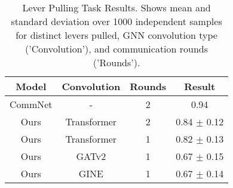 
\begin{table}[h]
\centering
\begin{tabular}{|c|c|c|c|}
\hline
\textbf{Model} & \textbf{Convolution} & \textbf{Rounds} & \textbf{Result} \\
\hline
CommNet & - & 2 & 0.94 \\
Ours & Transformer & 2 & 0.84 $\pm$ 0.12 \\
Ours & Transformer & 1 & 0.82 $\pm$ 0.13 \\
Ours & GATv2 & 1 & 0.67 $\pm$ 0.15 \\
Ours & GINE & 1 & 0.67 $\pm$ 0.14 \\
\hline
\end{tabular}
\caption{Lever Pulling Task Results. Shows mean and standard deviation over 1000 independent samples for distinct levers pulled, GNN convolution type ('Convolution'), and communication rounds ('Rounds').}
\label{tab:results-lever}
\end{table}
